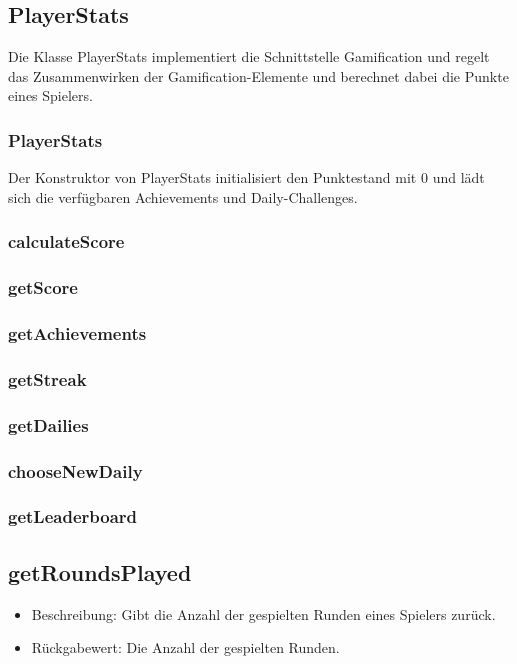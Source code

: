\documentclass[a4paper]{scrreprt}
\begin{document}
	
	\subsection{PlayerStats}
	Die Klasse PlayerStats implementiert die Schnittstelle Gamification und regelt das Zusammenwirken der Gamification-Elemente und berechnet dabei die Punkte eines Spielers.
	\subsubsection{PlayerStats}
	Der Konstruktor von PlayerStats initialisiert den Punktestand mit 0 und lädt sich die verfügbaren Achievements und Daily-Challenges.
	\subsubsection{calculateScore}
	\subsubsection{getScore}
	\subsubsection{getAchievements}
	\subsubsection{getStreak}
	\subsubsection{getDailies}
	\subsubsection{chooseNewDaily}
	\subsubsection{getLeaderboard}
	\subsection{getRoundsPlayed}
	\begin{itemize}
		\item Beschreibung: Gibt die Anzahl der gespielten Runden eines Spielers zurück.
		\item Rückgabewert: Die Anzahl der gespielten Runden.
	\end{itemize}
	
	
	
\end{document}
